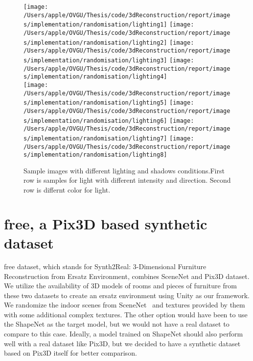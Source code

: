 \begin{figure}
    \centering
    \texttt{[image: /Users/apple/OVGU/Thesis/code/3dReconstruction/report/images/implementation/randomisation/lighting1]}
    \texttt{[image: /Users/apple/OVGU/Thesis/code/3dReconstruction/report/images/implementation/randomisation/lighting2]}
    \texttt{[image: /Users/apple/OVGU/Thesis/code/3dReconstruction/report/images/implementation/randomisation/lighting3]}
    \texttt{[image: /Users/apple/OVGU/Thesis/code/3dReconstruction/report/images/implementation/randomisation/lighting4]}\\
    \vspace{0.1cm}
    \texttt{[image: /Users/apple/OVGU/Thesis/code/3dReconstruction/report/images/implementation/randomisation/lighting5]}
    \texttt{[image: /Users/apple/OVGU/Thesis/code/3dReconstruction/report/images/implementation/randomisation/lighting6]}
    \texttt{[image: /Users/apple/OVGU/Thesis/code/3dReconstruction/report/images/implementation/randomisation/lighting7]}
    \texttt{[image: /Users/apple/OVGU/Thesis/code/3dReconstruction/report/images/implementation/randomisation/lighting8]}\\
    \caption{Sample images with different lighting and shadows conditions.First row is samples for light with different intensity and direction. Second row is differnt color for light.}
    \label{fig:Lighting and shadows}
\end{figure}

\section{\gls{free}, a Pix3D based synthetic dataset}\label{sec:s2r:3d-free-a-pix3d-based-synthetic-dataset}

\gls{free} dataset, which stands for Synth2Real: 3-Dimensional Furniture Reconstruction from Ersatz Environment, combines SceneNet and Pix3D dataset.
We utilize the availability of 3D models of rooms and pieces of furniture from these two datasets to create an ersatz environment using Unity as our framework.
We randomize the indoor scenes from SceneNet~\cite{McCormac:etal:ICCV2017} and textures provided by them with some additional complex textures.
The other option would have been to use the ShapeNet as the target model, but we would not have a real dataset to compare to this case.
Ideally, a model trained on ShapeNet should also perform well with a real dataset like Pix3D, but we decided to have a synthetic dataset based on Pix3D itself for better comparison.

